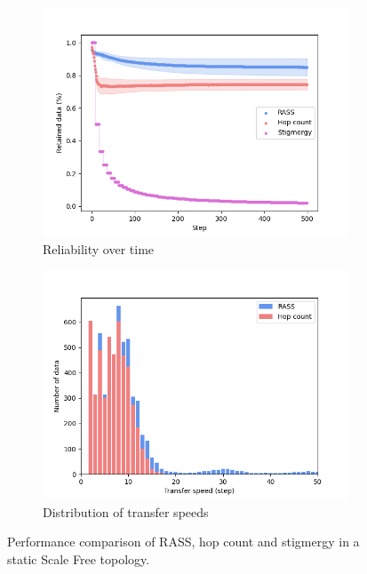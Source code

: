 \begin{figure}
    \centering
    \begin{subfigure}{0.8\textwidth}
        \includegraphics[width=\textwidth]{images/scale_reliability.png}
        \caption{Reliability over time}
        \label{results:scale_100_reliability}
    \end{subfigure}
    \begin{subfigure}{0.8\textwidth}
        \includegraphics[width=\textwidth]{images/scale_speed.png}
        \caption{Distribution of transfer speeds}
        \label{results:scale_100_speed}
    \end{subfigure}
    \caption{Performance comparison of RASS, hop count and stigmergy in a static Scale Free topology.}
    \label{results:staticTopologyScale}
    \vspace{-2mm}
\end{figure}

